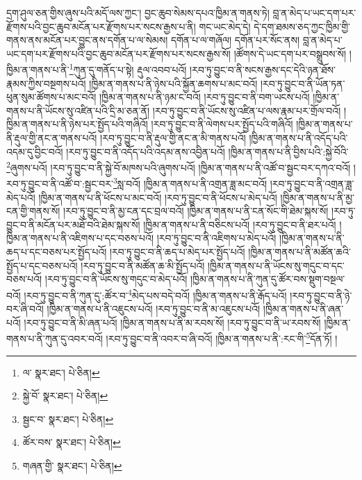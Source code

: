 དྲག་ཤུལ་ཅན་གྱིས་ཞུས་པའི་མདོ་ལས་ཀྱང་། བྱང་ཆུབ་སེམས་དཔའ་ཁྱིམ་ན་གནས་ཏེ། བླ་ན་མེད་པ་ཡང་དག་པར་རྫོགས་པའི་བྱང་ཆུབ་མངོན་པར་རྫོགས་པར་སངས་རྒྱས་པ་ནི། གང་ཡང་མེད་དེ། དེ་དག་ཐམས་ཅད་ཀྱང་ཁྱིམ་གྱི་གནས་ནས་མངོན་པར་བྱུང་ནས་དགོན་པ་ལ་སེམས། དགོན་པ་ལ་གཞོལ། དགོན་པར་སོང་ནས། བླ་ན་མེད་པ་ཡང་དག་པར་རྫོགས་པའི་བྱང་ཆུབ་མངོན་པར་རྫོགས་པར་སངས་རྒྱས་སོ། །ཚོགས་དེ་ཡང་དག་པར་བསྒྲུབས་སོ། །ཁྱིམ་ན་གནས་པ་ནི་\footnote{ལ་  སྣར་ཐང་།  པེ་ཅིན། }ཀུན་དུ་གནོད་པ་སྟེ། རྡུལ་འབབ་པའོ། །རབ་ཏུ་བྱུང་བ་ནི་སངས་རྒྱས་དང་དེའི་ཉན་ཐོས་རྣམས་ཀྱིས་བསྔགས་པའོ། །ཁྱིམ་ན་གནས་པ་ནི་ཉེས་པའི་སྐྱོན་ཆགས་པ་མང་བའོ། །རབ་ཏུ་བྱུང་བ་ནི་ཡོན་ཏན་ཕུན་སུམ་ཚོགས་པ་མང་བའོ། །ཁྱིམ་ན་གནས་པ་ནི་ཉམ་ང་བའོ། །རབ་ཏུ་བྱུང་བ་ནི་བག་ཡངས་པའོ། །ཁྱིམ་ན་གནས་པ་ནི་ཡོངས་སུ་འཛིན་པའི་དྲི་མ་ཅན་ནོ། །རབ་ཏུ་བྱུང་བ་ནི་ཡོངས་སུ་འཛིན་པ་ལས་རྣམ་པར་གྲོལ་བའོ། །ཁྱིམ་ན་གནས་པ་ནི་ཉེས་པར་སྤྱོད་པའི་གཞིའོ། །རབ་ཏུ་བྱུང་བ་ནི་ལེགས་པར་སྤྱོད་པའི་གཞིའོ། །ཁྱིམ་ན་གནས་པ་ནི་རྡུལ་གྱི་ནང་ན་གནས་པའོ། །རབ་ཏུ་བྱུང་བ་ནི་རྡུལ་གྱི་ནང་ན་མི་གནས་པའོ། །ཁྱིམ་ན་གནས་པ་ནི་འདོད་པའི་འདམ་དུ་བྱིང་བའོ། །རབ་ཏུ་བྱུང་བ་ནི་འདོད་པའི་འདམ་ནས་འབྱིན་པའོ། །ཁྱིམ་ན་གནས་པ་ནི་བྱིས་པའི་:སྐྱེ་བོའི་\footnote{སྐྱེ་བོ་  སྣར་ཐང་།  པེ་ཅིན། }ཞུགས་པའོ། །རབ་ཏུ་བྱུང་བ་ནི་སྐྱེ་བོ་མཁས་པའི་ཞུགས་པའོ། །ཁྱིམ་ན་གནས་པ་ནི་འཚོ་བ་སྦྱང་བར་དཀའ་བའོ། །རབ་ཏུ་བྱུང་བ་ནི་འཚོ་བ་:སྦྱང་བར་\footnote{སྦྱང་བ་  སྣར་ཐང་།  པེ་ཅིན། }སླ་བའོ། །ཁྱིམ་ན་གནས་པ་ནི་འགྲན་ཟླ་མང་བའོ། །རབ་ཏུ་བྱུང་བ་ནི་འགྲན་ཟླ་མེད་པའོ། །ཁྱིམ་ན་གནས་པ་ནི་ཕོངས་པ་མང་བའོ། །རབ་ཏུ་བྱུང་བ་ནི་ཕོངས་པ་མེད་པའོ། །ཁྱིམ་ན་གནས་པ་ནི་མྱ་ངན་གྱི་གནས་སོ། །རབ་ཏུ་བྱུང་བ་ནི་མྱ་ངན་དང་བྲལ་བའོ། །ཁྱིམ་ན་གནས་པ་ནི་ངན་སོང་གི་ཐེམ་སྐས་སོ། །རབ་ཏུ་བྱུང་བ་ནི་མངོན་པར་མཐོ་བའི་ཐེམ་སྐས་སོ། །ཁྱིམ་ན་གནས་པ་ནི་བཅིངས་པའོ། །རབ་ཏུ་བྱུང་བ་ནི་ཐར་པའོ། །ཁྱིམ་ན་གནས་པ་ནི་འཇིགས་པ་དང་བཅས་པའོ། །རབ་ཏུ་བྱུང་བ་ནི་འཇིགས་པ་མེད་པའོ། །ཁྱིམ་ན་གནས་པ་ནི་ཆད་པ་དང་བཅས་པར་སྤྱོད་པའོ། །རབ་ཏུ་བྱུང་བ་ནི་ཆད་པ་མེད་པར་སྤྱོད་པའོ། །ཁྱིམ་ན་གནས་པ་ནི་མཚོན་ཆའི་སྤྱོད་པ་དང་བཅས་པའོ། །རབ་ཏུ་བྱུང་བ་ནི་མཚོན་ཆ་མི་སྤྱོད་པའོ། །ཁྱིམ་ན་གནས་པ་ནི་ཡོངས་སུ་གདུང་བ་དང་བཅས་པའོ། །རབ་ཏུ་བྱུང་བ་ནི་ཡོངས་སུ་གདུང་བ་མེད་པའོ། །ཁྱིམ་ན་གནས་པ་ནི་ཀུན་དུ་ཚོར་བས་སྡུག་བསྔལ་བའོ། །རབ་ཏུ་བྱུང་བ་ནི་ཀུན་དུ་:ཚོར་བ་\footnote{ཚོར་བས་  སྣར་ཐང་།  པེ་ཅིན། }མེད་པས་བདེ་བའོ། །ཁྱིམ་ན་གནས་པ་ནི་རྒོད་པའོ། །རབ་ཏུ་བྱུང་བ་ནི་ཉེ་བར་ཞི་བའོ། །ཁྱིམ་ན་གནས་པ་ནི་འཇུངས་པའོ། །རབ་ཏུ་བྱུང་བ་ནི་མ་འཇུངས་པའོ། །ཁྱིམ་ན་གནས་པ་ནི་ཞན་པའོ། །རབ་ཏུ་བྱུང་བ་ནི་མི་ཞན་པའོ། །ཁྱིམ་ན་གནས་པ་ནི་མ་རབས་སོ། །རབ་ཏུ་བྱུང་བ་ནི་ཡ་རབས་སོ། །ཁྱིམ་ན་གནས་པ་ནི་ཀུན་དུ་འབར་བའོ། །རབ་ཏུ་བྱུང་བ་ནི་འབར་བ་ཞི་བའོ། །ཁྱིམ་ན་གནས་པ་ནི་:རང་གི་\footnote{གཞན་གྱི་  སྣར་ཐང་།  པེ་ཅིན། }དོན་ཏོ། །
